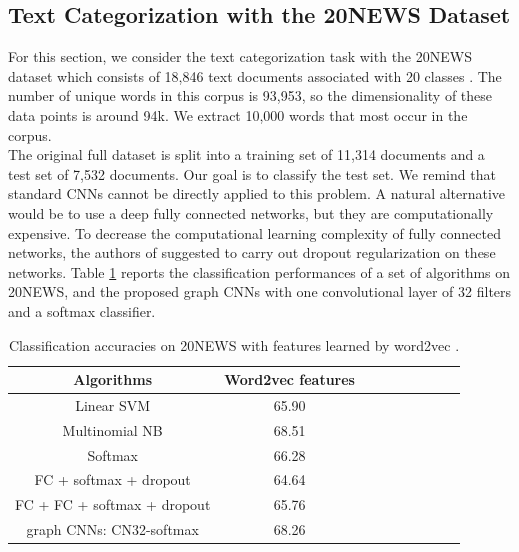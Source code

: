 \documentclass{article}
\begin{document}
\subsection{Text Categorization with the 20NEWS Dataset}
\vspace{-0.2cm}
For this section, we consider the text categorization task with the 20NEWS dataset which consists of 18,846 text documents associated with 20 classes \cite{art:Joachims9620NEWS}. The number of unique words in this corpus is 93,953, so the dimensionality of these data points is around 94k. We extract 10,000 words that most occur in the corpus.\\
The original full dataset is split into a training set of 11,314 documents and a test set of 7,532 documents. Our goal is to classify the test set. We remind that standard CNNs cannot be directly applied to this problem. A natural alternative would be to use a deep fully connected networks, but they are computationally expensive. To decrease the computational learning complexity of fully connected networks, the authors of \cite{art:HenaffBrunaLeCun15DLgraphs} suggested to carry out dropout regularization \cite{art:SrivastavaHintonKrizhevskySutskeverSalakhutdinov14dropout} on these networks. Table \ref{tab4a} reports the classification performances of a set of algorithms on 20NEWS, and the proposed graph CNNs with one convolutional layer of 32 filters and a softmax classifier.



\begin{table}[h!]
 \centering
{\small
\begin{tabular}{|c|c|c|c|c|c|c|c|c|}
\hline
 Algorithms & Word2vec features  \\
\hline
Linear SVM & 65.90  \\
Multinomial NB & 68.51 \\
Softmax & 66.28 \\
FC + softmax + dropout & 64.64 \\
FC + FC + softmax + dropout & 65.76 \\
graph CNNs: CN32-softmax & 68.26 \\
\hline
\end{tabular}
}
\caption{Classification accuracies on 20NEWS with features learned by word2vec \cite{pro:MikolovChenCorradoDean13word2vec}.} 
\label{tab4a}
\end{table}
\end{document}
